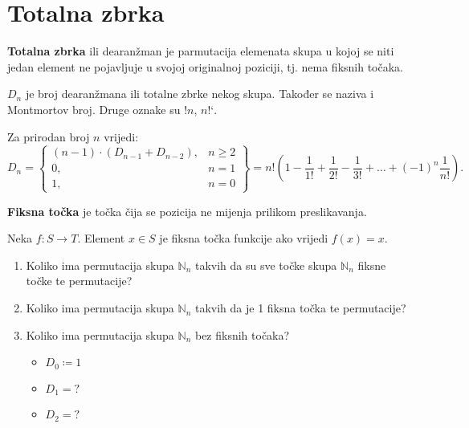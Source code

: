 \section{Totalna zbrka}

\textbf{Totalna zbrka} ili dearanžman je parmutacija elemenata skupa u kojoj se
niti jedan element ne pojavljuje u svojoj originalnoj poziciji, tj. nema fiksnih
točaka.

\bigskip
\noindent
$D_n$ je broj dearanžmana ili totalne zbrke nekog skupa. Također se naziva i Montmortov broj. Druge oznake su $!n$, $n\text{!`}$.

\begin{theorem}
    Za prirodan broj $n$ vrijedi:
    $$
        D_n = \begin{Bmatrix}
            (n-1) \cdot (D_{n - 1} + D_{n - 2}),&n \geq 2\\
            0,&n = 1\\
            1,&n = 0
        \end{Bmatrix} = n! \left(1-\frac{1}{1!} + \frac{1}{2!} - \frac{1}{3!} + \dots + (-1)^n \frac{1}{n!}\right).
    $$
\end{theorem}

\textbf{Fiksna točka} je točka čija se pozicija ne mijenja prilikom preslikavanja.

\begin{problem}
    Neka $f:S\to T$. Element $x\in S$ je fiksna točka funkcije ako vrijedi $f(x)
    = x$.

    \begin{enumerate}
        \item Koliko ima permutacija skupa $\mathbb{N}_n$ takvih da su sve točke
        skupa $\mathbb{N}_n$ fiksne točke te permutacije?
        \item Koliko ima permutacija skupa $\mathbb{N}_n$ takvih da je 1 fiksna
        točka te permutacije?
        \item Koliko ima permutacija skupa $\mathbb{N}_n$ bez fiksnih točaka?
        \begin{itemize}
            \item $D_0 \coloneq 1$
            \item $D_1 = ?$
            \item $D_2 = ?$
        \end{itemize}
    \end{enumerate}
\end{problem}

